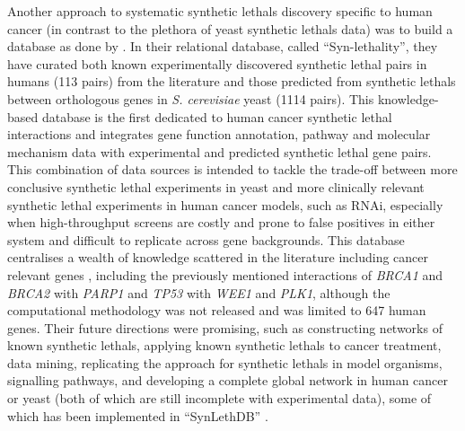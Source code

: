 Another approach to systematic \glspl{synthetic lethal} discovery specific to human cancer (in contrast to the plethora of yeast \glspl{synthetic lethal} data) was to build a database as done by \citet{Li2014}. In their relational database, called ``Syn-lethality'', they have curated both known experimentally discovered \gls{synthetic lethal} pairs in humans (113 pairs) from the literature and those predicted from \glspl{synthetic lethal} between orthologous genes in \textit{S. cerevisiae} yeast (1114 pairs). This knowledge-based database is the first dedicated to human cancer \gls{synthetic lethal} interactions and integrates gene function annotation, \gls{pathway} and molecular mechanism data with experimental and predicted \gls{synthetic lethal} gene pairs. This combination of data sources is intended to tackle the trade-off between more conclusive \gls{synthetic lethal} experiments in yeast and more clinically relevant \gls{synthetic lethal} experiments in human cancer models, such as \gls{RNAi}, especially when high-throughput screens are costly and prone to false positives in either system and difficult to replicate across gene backgrounds. This database centralises a wealth of knowledge scattered in the literature including cancer relevant genes%
, including the previously mentioned interactions of \textit{BRCA1} and \textit{BRCA2} with \textit{PARP1} and \textit{TP53} with \textit{WEE1} and \textit{PLK1}, although the computational methodology was not released %
and was limited to 647 human genes. Their future directions were promising, such as constructing networks of known \glspl{synthetic lethal}, applying known \glspl{synthetic lethal} to cancer treatment, data mining, replicating the approach for \glspl{synthetic lethal} in model organisms, signalling pathways, and developing a complete global network in human cancer or yeast (both of which are still incomplete with experimental data), some of which has been implemented in ``SynLethDB'' \citep{Guo2016}.  


